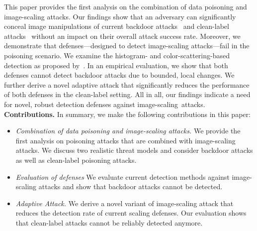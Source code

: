 \documentclass[conference]{IEEEtran}
\renewcommand{\paragraph}[1]{{\vskip 8pt \noindent\bf #1 }}
\begin{document}
This paper {provides\EndAccSupp{}} the first analysis on the combination of data 
poisoning and image-scaling attacks. Our findings show that an 
adversary can significantly conceal image manipulations of {current\EndAccSupp{}} 
backdoor attacks~\citep{GuDolGar17} and clean-label 
attacks~\citep{ShaHuaNaj+18} without an impact on their {overall\EndAccSupp{}} attack 
success rate.
Moreover, we demonstrate that {defenses\EndAccSupp{}}---designed to detect 
image-scaling attacks---fail in the poisoning scenario.
We examine the histogram- and color-scattering-based detection as 
proposed by~\citet{XiaCheShe+19}. In an empirical {evaluation\EndAccSupp{}}, we show 
that both {defenses\EndAccSupp{}} cannot detect backdoor attacks due to bounded, 
local changes. We further derive a novel {adaptive\EndAccSupp{}} attack that 
significantly reduces the {performance\EndAccSupp{}} of both {defenses\EndAccSupp{}} in the 
clean-label setting.
All in all, our findings indicate a need for novel, robust detection 
defenses against image-scaling~attacks.
\paragraph{Contributions.}  In summary, we make the following
contributions in this paper:
\begin{itemize}  \setlength{\itemsep}{3pt}
	
	\item \emph{Combination of data poisoning and image-scaling 
	attacks.}  
	We provide the first analysis on poisoning attacks that are 
	combined with image-scaling attacks. We discuss two realistic 
	threat {models\EndAccSupp{}} and consider backdoor attacks as well as clean-label 
	poisoning attacks.
		
	\item \emph{Evaluation of defenses} 
	We {evaluate\EndAccSupp{}} current detection {methods\EndAccSupp{}} against image-scaling 
	attacks and show that backdoor attacks cannot be detected.
	
	\item \emph{Adaptive Attack.} We derive a novel variant of
	image-scaling attack that reduces the detection {rate\EndAccSupp{}} 
	of current scaling defenses. Our evaluation 
	shows that clean-label attacks cannot be reliably detected anymore.
\end{itemize}
\end{document}
